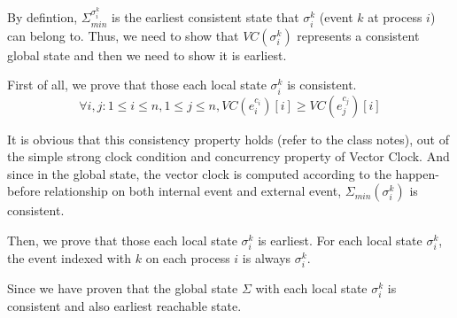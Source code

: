 \documentclass[11pt,a4paper]{article}
\begin{document}
By defintion, 
$ \Sigma_{min}^{\sigma_{i}^{k}}$ is the earliest consistent state that  $
\sigma_i^k$ (event $k$ at process $i$) can belong to. Thus, we need to show
that $VC(\sigma_{i}^{k})$ represents a consistent global state and then we need to show it
is earliest.

First of all, we prove that those each local state $\sigma_i^k$ is consistent.
$$ 
\forall i,j: 1 \leq i \leq n, 1 \leq j \leq n, VC (e_i^{c_i})[i] \geq VC
(e_j^{c_{j}})[i]  $$

It is obvious that this consistency property holds (refer to the class notes),
out of the simple strong clock condition and concurrency property of Vector
Clock. And since in the global state, the vector clock is computed according
to the happen-before relationship on both internal event and external event,
$\Sigma_{min}(\sigma_i^k)$ is consistent.

Then, we prove that those each local state $\sigma_i^k$ is earliest.
For each local state $\sigma_i^k$, the event indexed with $k$ on each process
$i$ is always $\sigma_i^k$. 

Since we have proven that the global state $\Sigma$ with each local state
$\sigma_i^k$ is consistent and also earliest reachable state.

\end{document}
